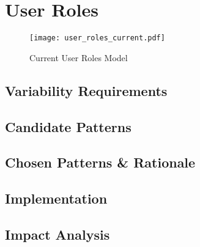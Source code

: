 \section{User Roles}\label{sec:fa_roles}

\begin{figure}[H]
  \centering
  \texttt{[image: user\_roles\_current.pdf]}
  \caption{Current User Roles Model}
  \label{fig:user_roles_current}
\end{figure}

\subsection{Variability Requirements}\label{sec:fa_roles_variability_requirements}

\subsection{Candidate Patterns}\label{sec:fa_roles_candidate_patterns}

\subsection{Chosen Patterns \& Rationale}\label{sec:fa_roles_chosen_patterns_rationale}

\subsection{Implementation}\label{sec:fa_roles_implementation}

\subsection{Impact Analysis}\label{sec:fa_roles_impact_analysis}
